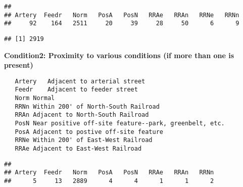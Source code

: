 \documentclass[]{article}
\newenvironment{Shaded}{\begin{snugshade}}{\end{snugshade}}
\newcommand{\CommentTok}[1]{\textcolor[rgb]{0.56,0.35,0.01}{\textit{#1}}}
\newcommand{\KeywordTok}[1]{\textcolor[rgb]{0.13,0.29,0.53}{\textbf{#1}}}
\newcommand{\NormalTok}[1]{#1}
\newcommand{\OperatorTok}[1]{\textcolor[rgb]{0.81,0.36,0.00}{\textbf{#1}}}
\newcommand{\StringTok}[1]{\textcolor[rgb]{0.31,0.60,0.02}{#1}}
\begin{document}
\begin{Shaded}
\end{Shaded}

\begin{verbatim}
## 
## Artery  Feedr   Norm   PosA   PosN   RRAe   RRAn   RRNe   RRNn 
##     92    164   2511     20     39     28     50      6      9
\end{verbatim}

\begin{Shaded}
\end{Shaded}

\begin{verbatim}
## [1] 2919
\end{verbatim}

\textbf{Condition2: Proximity to various conditions (if more than one is
present)}

\begin{verbatim}
   Artery   Adjacent to arterial street
   Feedr    Adjacent to feeder street   
   Norm Normal  
   RRNn Within 200' of North-South Railroad
   RRAn Adjacent to North-South Railroad
   PosN Near positive off-site feature--park, greenbelt, etc.
   PosA Adjacent to postive off-site feature
   RRNe Within 200' of East-West Railroad
   RRAe Adjacent to East-West Railroad
\end{verbatim}

\begin{Shaded}
\end{Shaded}

\begin{verbatim}
## 
## Artery  Feedr   Norm   PosA   PosN   RRAe   RRAn   RRNn 
##      5     13   2889      4      4      1      1      2
\end{verbatim}
\end{document}
